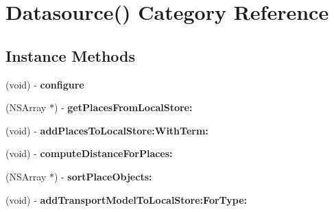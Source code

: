 \hypertarget{category_datasource_07_08}{}\section{Datasource() Category Reference}
\label{category_datasource_07_08}
\subsection*{Instance Methods}
\begin{DoxyCompactItemize}
\item 
(void) -\/ {\bfseries configure}\hypertarget{category_datasource_07_08_ab2f82d29bc7c0c8f8cf9a5b0a440b08e}{}\label{category_datasource_07_08_ab2f82d29bc7c0c8f8cf9a5b0a440b08e}

\item 
(N\+S\+Array $\ast$) -\/ {\bfseries get\+Places\+From\+Local\+Store\+:}\hypertarget{category_datasource_07_08_a552082fa5d1a206470bdf4b55532c823}{}\label{category_datasource_07_08_a552082fa5d1a206470bdf4b55532c823}

\item 
(void) -\/ {\bfseries add\+Places\+To\+Local\+Store\+:\+With\+Term\+:}\hypertarget{category_datasource_07_08_ae8f07501e1b27da8737bfe27b4568d2a}{}\label{category_datasource_07_08_ae8f07501e1b27da8737bfe27b4568d2a}

\item 
(void) -\/ {\bfseries compute\+Distance\+For\+Places\+:}\hypertarget{category_datasource_07_08_a16a5718132576814629b76a03316ac5b}{}\label{category_datasource_07_08_a16a5718132576814629b76a03316ac5b}

\item 
(N\+S\+Array $\ast$) -\/ {\bfseries sort\+Place\+Objects\+:}\hypertarget{category_datasource_07_08_a313a0bf1c69bb909a1af2a49bd5c3121}{}\label{category_datasource_07_08_a313a0bf1c69bb909a1af2a49bd5c3121}

\item 
(void) -\/ {\bfseries add\+Transport\+Model\+To\+Local\+Store\+:\+For\+Type\+:}\hypertarget{category_datasource_07_08_a9019df86f19a43543697cb7ddd4c1cea}{}\label{category_datasource_07_08_a9019df86f19a43543697cb7ddd4c1cea}

\end{DoxyCompactItemize}
